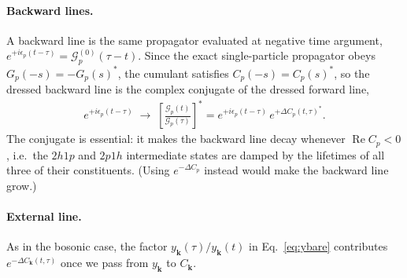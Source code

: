 \paragraph{Backward lines.}
A backward line is the same propagator evaluated at negative time argument, $e^{+i\epsilon_p(t-\tau)}=\mathcal{G}^{(0)}_p(\tau-t)$. Since the exact single-particle propagator obeys $G_p(-s)=-G_p(s)^*$, the cumulant satisfies $C_p(-s)=C_p(s)^*$, so the dressed backward line is the complex conjugate of the dressed forward line,
\begin{align}
e^{+i\epsilon_p(t-\tau)}
\;\longrightarrow\;
\left[\frac{\mathcal{G}_p(t)}{\mathcal{G}_p(\tau)}\right]^{*}
=
e^{+i\epsilon_p(t-\tau)}\,e^{+\Delta C_p(t,\tau)^{*}}.
\end{align}
The conjugate is essential: it makes the backward line decay whenever $\operatorname{Re}C_p<0$, i.e.\ the $2h1p$ and $2p1h$ intermediate states are damped by the lifetimes of all three of their constituents. (Using $e^{-\Delta C_p}$ instead would make the backward line grow.)

\paragraph{External line.}
As in the bosonic case, the factor $y_{\bm{k}}(\tau)/y_{\bm{k}}(t)$ in Eq.~\eqref{eq:ybare} contributes $e^{-\Delta C_{\bm{k}}(t,\tau)}$ once we pass from $y_{\bm{k}}$ to $C_{\bm{k}}$.

